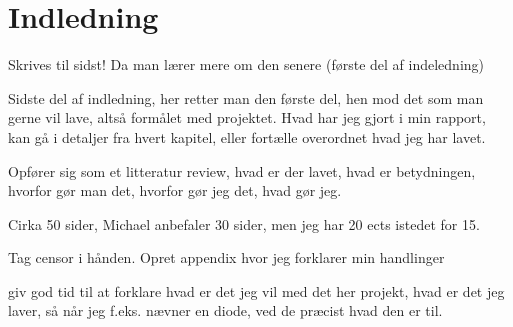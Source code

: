 \chapter{Indledning}
Skrives til sidst! Da man lærer mere om den senere (første del af indeledning)

Sidste del af indledning, her retter man den første del, hen mod det som man gerne vil lave, altså formålet med projektet. Hvad har jeg gjort i min rapport, kan gå i detaljer fra hvert kapitel, eller fortælle overordnet hvad jeg har lavet.

Opfører sig som et litteratur review, hvad er der lavet, hvad er betydningen, hvorfor gør man det, hvorfor gør jeg det, hvad gør jeg.

Cirka 50 sider, Michael anbefaler 30 sider, men jeg har 20 ects istedet for 15.

Tag censor i hånden. Opret appendix hvor jeg forklarer min handlinger

giv god tid til at forklare hvad er det jeg vil med det her projekt, hvad er det jeg laver, så når jeg f.eks. nævner en diode, ved de præcist hvad den er til.